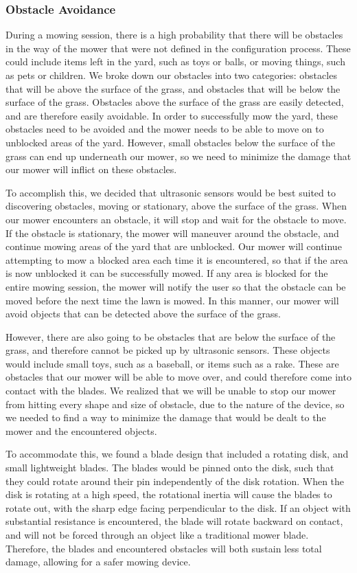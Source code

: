 \documentclass[12pt,letterpaper]{article}
\begin{document}
\subsubsection{Obstacle Avoidance}

During a mowing session, there is a high probability that there will be
obstacles in the way of the mower that were not defined in the configuration
process. These could include items left in the yard, such as toys or balls, or
moving things, such as pets or children. We broke down our obstacles into two
categories: obstacles that will be above the surface of the grass, and obstacles
that will be below the surface of the grass. Obstacles above the surface of the
grass are easily detected, and are therefore easily avoidable. In order to
successfully mow the yard, these obstacles need to be avoided and the mower
needs to be able to move on to unblocked areas of the yard. However, small
obstacles below the surface of the grass can end up underneath our mower, so we
need to minimize the damage that our mower will inflict on these obstacles.

To accomplish this, we decided that ultrasonic sensors would be best suited to
discovering obstacles, moving or stationary, above the surface of the grass.
When our mower encounters an obstacle, it will stop and wait for the obstacle to
move. If the obstacle is stationary, the mower will maneuver around the
obstacle, and continue mowing areas of the yard that are unblocked. Our mower
will continue attempting to mow a blocked area each time it is encountered, so
that if the area is now unblocked it can be successfully mowed. If any area is
blocked for the entire mowing session, the mower will notify the user so that
the obstacle can be moved before the next time the lawn is mowed. In this
manner, our mower will avoid objects that can be detected above the surface of
the grass.

However, there are also going to be obstacles that are below the surface of the
grass, and therefore cannot be picked up by ultrasonic sensors. These objects
would include small toys, such as a baseball, or items such as a rake. These are
obstacles that our mower will be able to move over, and could therefore come
into contact with the blades. We realized that we will be unable to stop our
mower from hitting every shape and size of obstacle, due to the nature of the
device, so we needed to find a way to minimize the damage that would be dealt to
the mower and the encountered objects.

To accommodate this, we found a blade design that included a rotating disk, and
small lightweight blades. The blades would be pinned onto the disk, such that
they could rotate around their pin independently of the disk rotation. When the
disk is rotating at a high speed, the rotational inertia will cause the blades
to rotate out, with the sharp edge facing perpendicular to the disk. If an
object with substantial resistance is encountered, the blade will rotate
backward on contact, and will not be forced through an object like a traditional
mower blade. Therefore, the blades and encountered obstacles will both sustain
less total damage, allowing for a safer mowing device.
\end{document}
